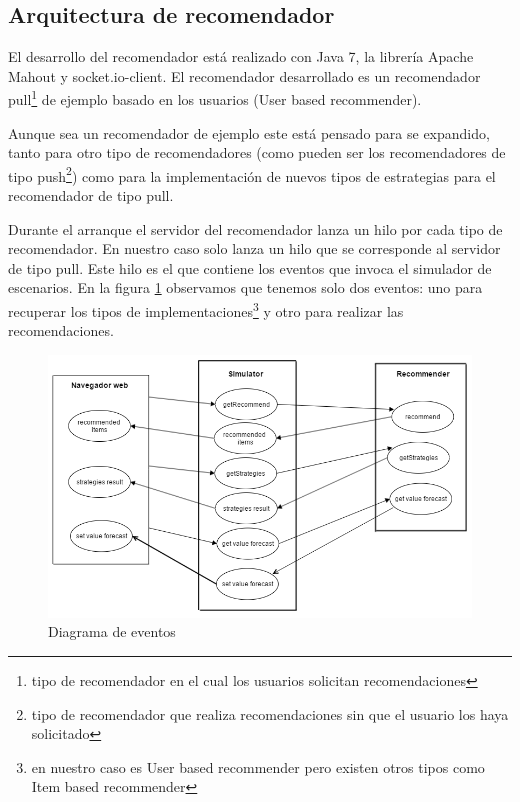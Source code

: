 \subsection{Arquitectura de recomendador}

El desarrollo del recomendador está realizado con Java 7, la librería Apache Mahout y socket.io-client. El recomendador desarrollado es un recomendador pull\footnote{tipo de recomendador en el cual los usuarios solicitan recomendaciones} de ejemplo basado en los usuarios (User based recommender). 

Aunque sea un recomendador de ejemplo este está pensado para se expandido, tanto para otro tipo de recomendadores (como pueden ser los recomendadores de tipo push\footnote{tipo de recomendador que realiza recomendaciones sin que el usuario los haya solicitado}) como para la implementación de nuevos tipos de estrategias para el recomendador de tipo pull.

Durante el arranque el servidor del recomendador lanza un hilo por cada tipo de recomendador. En nuestro caso solo lanza un hilo que se corresponde al servidor de tipo pull. Este hilo es el que contiene los eventos que invoca el simulador de escenarios. En la figura \ref{diagramaEventos} observamos que tenemos solo dos eventos: uno para recuperar los tipos de implementaciones\footnote{en nuestro caso es User based recommender pero existen otros tipos como Item based recommender} y otro para realizar las recomendaciones.

\begin{figure}[H]
\centering\includegraphics[scale=0.5]{imagenes/diagrama-de-eventos.png}
\caption{Diagrama de eventos}
\label{diagramaEventos}
\end{figure}

